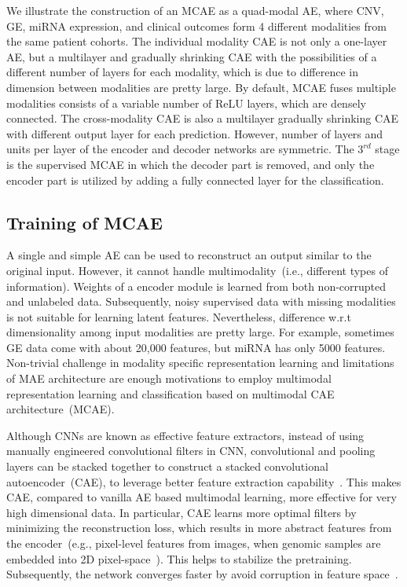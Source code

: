 \hspace*{3.5mm} We illustrate the construction of an MCAE as a quad-modal AE, where CNV, GE, miRNA expression, and clinical outcomes form 4 different modalities from the same patient cohorts. The individual modality CAE is not only a one-layer AE, but a multilayer and gradually shrinking CAE with the possibilities of a different number of layers for each modality, which is due to difference in dimension between modalities are pretty large. By default, MCAE fuses multiple modalities consists of a variable number of ReLU layers, which are densely connected. The cross-modality CAE is also a multilayer gradually shrinking CAE with different output layer for each prediction. However, number of layers and units per layer of the encoder and decoder networks are symmetric. The $3^{rd}$ stage is the supervised MCAE in which the decoder part is removed, and only the encoder part is utilized by adding a fully connected layer for the classification. %
\fi 

\subsection{Training of MCAE}
A single and simple AE can be used to reconstruct an output similar to the original input. However, it cannot handle multimodality~(i.e., different types of information). Weights of a encoder module is learned from both non-corrupted and unlabeled data. Subsequently, noisy supervised data with missing modalities is not suitable for learning latent features. Nevertheless, difference w.r.t dimensionality among input modalities are pretty large. For example, sometimes GE data come with about 20,000 features, but miRNA has only 5000 features. Non-trivial challenge in modality specific representation learning and limitations of MAE architecture are enough motivations to employ multimodal representation learning and classification based on multimodal CAE architecture~(MCAE). 

\hspace*{3.5mm} Although CNNs are known as effective feature extractors, instead of using manually engineered convolutional filters in CNN, convolutional and pooling layers can be stacked together to construct a stacked convolutional autoencoder~(CAE), to leverage better feature extraction capability~\cite{alirezaie2019semantic}. This makes CAE, compared to vanilla AE based multimodal learning, more effective for very high dimensional data. In particular, CAE learns more optimal filters by minimizing the reconstruction loss, which results in more abstract features from the encoder~(e.g., pixel-level features from images, when genomic samples are embedded into 2D pixel-space~\cite{mostavi2019convolutional}). This helps to stabilize the pretraining. Subsequently, the network converges faster by avoid corruption in feature space~\cite{guo2017deep}. 

